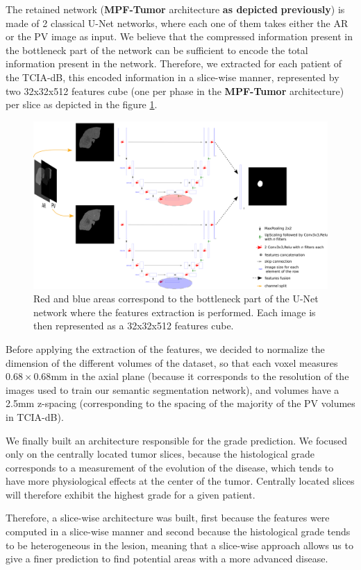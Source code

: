 \documentclass[]{article}
\newcommand{\pplfont}[1]{{\textbf{\fontfamily{ppl}\selectfont #1}}}
\newcommand{\lmttfont}[1]{{\fontfamily{lmtt}\selectfont #1}}
\begin{document}
The retained network (\pplfont{MPF-Tumor} architecture \textbf{as depicted}
\textbf{previously}) is made of 2 classical U-Net networks, where each
one of them takes either the AR or the PV image as input. We believe
that the compressed information present in the bottleneck part of the
network can be sufficient to encode the total information present in the
network. Therefore, we extracted for each patient of the \lmttfont{TCIA-dB}, this
encoded information in a slice-wise manner, represented by two 32x32x512
features cube (one per phase in the \pplfont{MPF-Tumor} architecture) per slice
as depicted in the figure \ref{fig:MPF_Features_Selection}.


\begin{figure}[th!]
\centering
\includegraphics[width=0.7\linewidth]{images/MPF_Features_Selection}
\caption{Red and blue areas correspond to the bottleneck part of the U-Net
network where the features extraction is performed. Each image is then
represented as a 32x32x512 features cube.}
\label{fig:MPF_Features_Selection}
\end{figure}


Before applying the extraction of the features, we decided to normalize
the dimension of the different volumes of the dataset, so that each
voxel measures $ 0.68\times0.68 $mm in the axial plane (because it corresponds to
the resolution of the images used to train our semantic segmentation
network), and volumes have a 2.5mm z-spacing (corresponding to the
spacing of the majority of the PV volumes in \lmttfont{TCIA-dB}).

We finally built an architecture responsible for the grade prediction.
We focused only on the centrally located tumor slices, because the
histological grade corresponds to a measurement of the evolution of the
disease, which tends to have more physiological effects at the center of
the tumor. Centrally located slices will therefore exhibit the highest
grade for a given patient.

Therefore, a slice-wise architecture was built, first because the
features were computed in a slice-wise manner and second because the
histological grade tends to be heterogeneous in the lesion, meaning that
a slice-wise approach allows us to give a finer prediction to find
potential areas with a more advanced disease.
\end{document}
